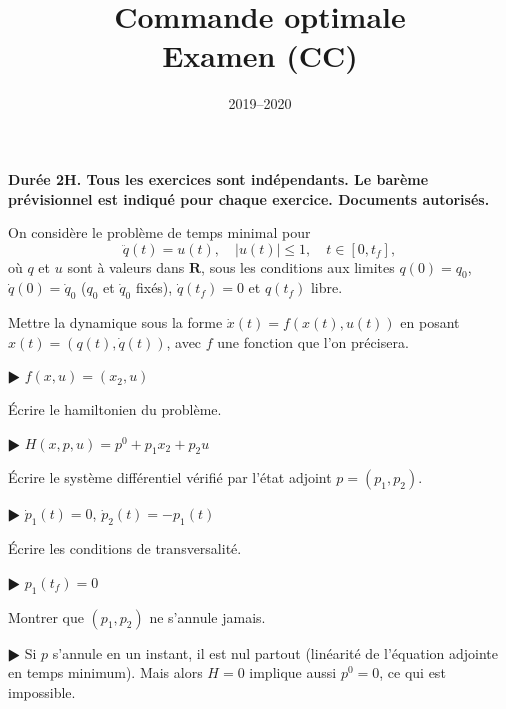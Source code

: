 \documentclass[11pt,a4paper]{article}
\title{Commande optimale\\Examen (CC)}
\date{2019--2020}
\def\R{\mathbf{R}}
\theoremstyle{plain}
\theoremstyle{definition}
\begin{document}
\maketitle

{\bf Dur\'ee 2H. Tous les exercices sont ind\'ependants.
Le bar\`eme pr\'e\-vi\-sion\-nel est indiqu\'e pour chaque exercice.
Documents autoris\'es.}%

\begin{Exercice}[10 points]
On consid\`ere le probl\`eme de temps minimal pour
\[ \ddot{q}(t)=u(t),\quad |u(t)| \leq 1,\quad t \in [0,t_f], \]
o\`u $q$ et $u$ sont \`a valeurs dans $\R$, sous les conditions aux limites
$q(0)=q_0$, $\dot{q}(0)=\dot{q}_0$ ($q_0$ et $\dot{q}_0$ fix\'es), $\dot{q}(t_f)=0$ et
$q(t_f)$ libre.
\begin{Question}
Mettre la dynamique sous la forme $\dot{x}(t)=f(x(t),u(t))$ en posant
$x(t)=(q(t),\dot{q}(t))$, avec $f$ une fonction que l'on pr\'ecisera.
\end{Question}
\begin{corr} $\RHD$ $f(x,u)=(x_2,u)$
\end{corr}

\begin{Question} \'Ecrire le hamiltonien du probl\`eme. 
\end{Question}
\begin{corr} $\RHD$ $H(x,p,u)=p^0+p_1x_2+p_2u$
\end{corr}

\begin{Question} \'Ecrire le syst\`eme diff\'erentiel v\'erifi\'e par l'\'etat adjoint
$p=(p_1,p_2)$. \end{Question}
\begin{corr} $\RHD$ $\dot{p}_1(t)=0$, $\dot{p}_2(t)=-p_1(t)$ \end{corr}

\begin{Question} \'Ecrire les conditions de transversalit\'e. \end{Question}
\begin{corr} $\RHD$ $p_1(t_f)=0$ \end{corr}

\begin{Question} Montrer que $(p_1,p_2)$ ne s'annule jamais. \end{Question}
\begin{corr} $\RHD$
Si $p$ s'annule en un instant, il est nul partout (lin\'earit\'e de
l'\'equation adjointe en temps minimum). Mais alors $H=0$ implique aussi $p^0=0$, ce
qui est impossible. \end{corr}


\end{Exercice}
\end{document}
